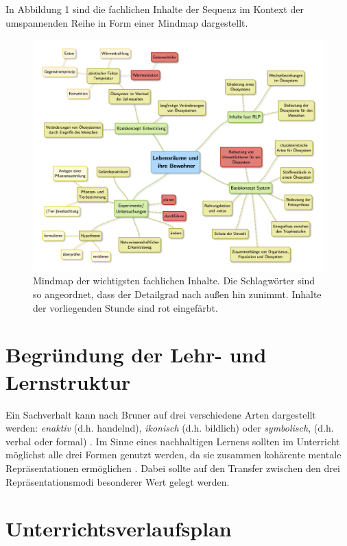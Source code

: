 In Abbildung 1 sind die fachlichen Inhalte der Sequenz im Kontext der umspannenden Reihe in Form einer Mindmap dargestellt.
\begin{figure}[H]
\includegraphics[width=\textwidth]{mindmap}
\caption{\small Mindmap der wichtigsten fachlichen Inhalte. Die Schlagwörter sind so angeordnet, dass der Detailgrad nach außen hin zunimmt. Inhalte der vorliegenden Stunde sind rot eingefärbt.}
\end{figure}
%
\begin{singlespacing}
\section{Begründung der Lehr- und Lernstruktur}
Ein Sachverhalt kann nach Bruner auf drei verschiedene Arten dargestellt werden: \textit{enaktiv} (d.h. handelnd), \textit{ikonisch} (d.h. bildlich) oder \textit{symbolisch}, (d.h. verbal oder formal) \parencite[49]{brunner_1974}. 
Im Sinne eines nachhaltigen Lernens sollten im Unterricht möglichst alle drei Formen genutzt werden, da sie zusammen kohärente mentale Repräsentationen ermöglichen \parencite[56]{kiper_2006}. Dabei sollte auf den Transfer zwischen den drei Repräsentationsmodi besonderer Wert gelegt werden.
\begin{landscape}
\enlargethispage{2cm}
\end{landscape}
\newpage
%
\section{Unterrichtsverlaufsplan}
\end{singlespacing}
%
\renewcommand{\refname}{7 Literatur und Internetquellen}
\printbibliography[]
%
\newpage
\setcounter{section}{7}

